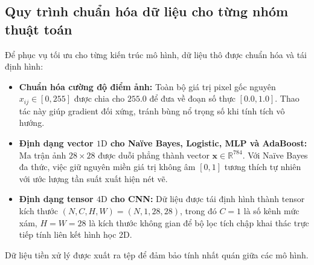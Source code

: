 \subsection{Quy trình chuẩn hóa dữ liệu cho từng nhóm thuật toán}
Để phục vụ tối ưu cho từng kiến trúc mô hình, dữ liệu thô được chuẩn hóa và tái định hình:
\begin{itemize}
    \item \textbf{Chuẩn hóa cường độ điểm ảnh:} Toàn bộ giá trị pixel gốc nguyên $x_{ij} \in [0, 255]$ được chia cho $255.0$ để đưa về đoạn số thực $[0.0, 1.0]$. Thao tác này giúp gradient đối xứng, tránh bùng nổ trọng số khi tính tích vô hướng.
    \item \textbf{Định dạng vector $1\text{D}$ cho Naïve Bayes, Logistic, MLP và AdaBoost:} Ma trận ảnh $28 \times 28$ được duỗi phẳng thành vector $\mathbf{x} \in \mathbb{R}^{784}$. Với Naïve Bayes đa thức, việc giữ nguyên miền giá trị không âm $[0, 1]$ tương thích tự nhiên với ước lượng tần suất xuất hiện nét vẽ.
    \item \textbf{Định dạng tensor $4\text{D}$ cho CNN:} Dữ liệu được tái định hình thành tensor kích thước $(N, C, H, W) = (N, 1, 28, 28)$, trong đó $C = 1$ là số kênh mức xám, $H = W = 28$ là kích thước không gian để bộ lọc tích chập khai thác trực tiếp tính liên kết hình học 2D.
\end{itemize}
Dữ liệu tiền xử lý được xuất ra tệp  để đảm bảo tính nhất quán giữa các mô hình.
